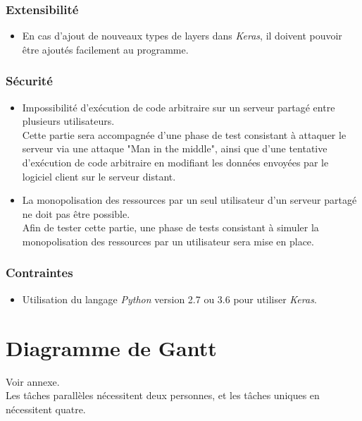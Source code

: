 \documentclass{article}
\begin{document}
\subsubsection{Extensibilité}
\begin{itemize}
\item En cas d'ajout de nouveaux types de layers dans \textit{Keras}, il doivent pouvoir être ajoutés facilement au programme.
\end{itemize}
\subsubsection{Sécurité}
\begin{itemize}
\item Impossibilité d'exécution de code arbitraire sur un serveur partagé entre plusieurs utilisateurs. \\
Cette partie sera accompagnée d'une phase de test consistant à attaquer le serveur via une attaque "Man in the middle", ainsi que d'une tentative d'exécution de code arbitraire en modifiant les données envoyées par le logiciel client sur le serveur distant.
\item La monopolisation des ressources par un seul utilisateur d'un serveur partagé ne doit pas être possible.\\
Afin de tester cette partie, une phase de tests consistant à simuler la monopolisation des ressources par un utilisateur sera mise en place. 
\end{itemize}

\subsubsection{Contraintes}
\begin{itemize}
\item Utilisation du langage \textit{Python} version 2.7 ou 3.6 pour utiliser \textit{Keras}.
\end{itemize}

\section{Diagramme de Gantt}

Voir annexe. \\
Les tâches parallèles nécessitent deux personnes, et les tâches uniques en nécessitent quatre.



\end{document}
